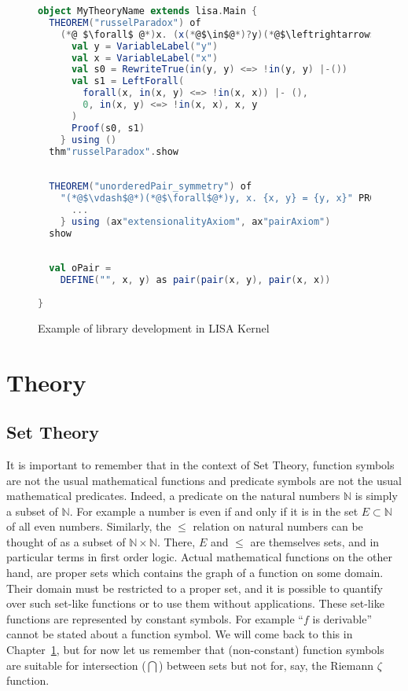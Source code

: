 \begin{figure}[hp]
  \begin{lstlisting}[language=Scala, frame=single]
object MyTheoryName extends lisa.Main {
  THEOREM("russelParadox") of 
    (*@ $\forall$ @*)x. (x(*@$\in$@*)?y)(*@$\leftrightarrow$@*) (*@$\neg$@*)(x(*@$\in$@*)x)(*@$\vdash$@*) PROOF {
      val y = VariableLabel("y")
      val x = VariableLabel("x")
      val s0 = RewriteTrue(in(y, y) <=> !in(y, y) |-())
      val s1 = LeftForall(
        forall(x, in(x, y) <=> !in(x, x)) |- (),
        0, in(x, y) <=> !in(x, x), x, y
      )
      Proof(s0, s1)
    } using ()
  thm"russelParadox".show
  
  
  THEOREM("unorderedPair_symmetry") of
    "(*@$\vdash$@*)(*@$\forall$@*)y, x. {x, y} = {y, x}" PROOF {
      ...
    } using (ax"extensionalityAxiom", ax"pairAxiom")
  show
  
  
  val oPair = 
    DEFINE("", x, y) as pair(pair(x, y), pair(x, x))
  
}
\end{lstlisting}
  \caption{Example of library development in LISA Kernel}
  \label{fig:kernellibrary}
\end{figure}

\part{Theory}

\chapter{Set Theory}
\label{chapt:settheory}

It is important to remember that in the context of Set Theory, function symbols are not the usual mathematical functions and predicate symbols are not the usual mathematical predicates. Indeed, a predicate on the natural numbers $\mathbb N$ is simply a subset of $\mathbb N$. For example a number is even if and only if it is in the set $E \subset \mathbb N$ of all even numbers. Similarly, the $\leq$ relation on natural numbers can be thought of as a subset of $\mathbb N \times \mathbb N$. There, $E$ and $\leq$ are themselves sets, and in particular terms in first order logic.
Actual mathematical functions on the other hand, are proper sets which contains the graph of a function on some domain. Their domain must be restricted to a proper set, and it is possible to quantify over such set-like functions or to use them without applications. These set-like functions are represented by constant symbols.  For example ``$f$ is derivable'' cannot be stated about a function symbol. We will come back to this in Chapter~\ref{chapt:settheory}, but for now let us remember that (non-constant) function symbols are suitable for intersection ($\bigcap$) between sets but not for, say, the Riemann $\zeta$ function.


